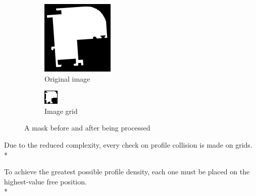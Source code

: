 \documentclass{article}
\begin{document}
	\begin{figure}[h]
		\centering
		\begin{subfigure}{0.5\textwidth}
			\centering
			\includegraphics[width=0.6\linewidth]{img}
			\caption{Original image}
			\label{fig:img}
		\end{subfigure}%
		\begin{subfigure}{0.5\textwidth}
			\centering
			\includegraphics[width=0.6\linewidth]{grid}
			\caption{Image grid}
			\label{fig:grid}
		\end{subfigure}
		\caption{A mask before and after being processed}
		\label{fig:test}
	\end{figure}

	Due to the reduced complexity, every check on profile collision is made on grids. \\*
	
	To achieve the greatest possible profile density, each one must be placed on the highest-value free position. \\*
	
\end{document}
